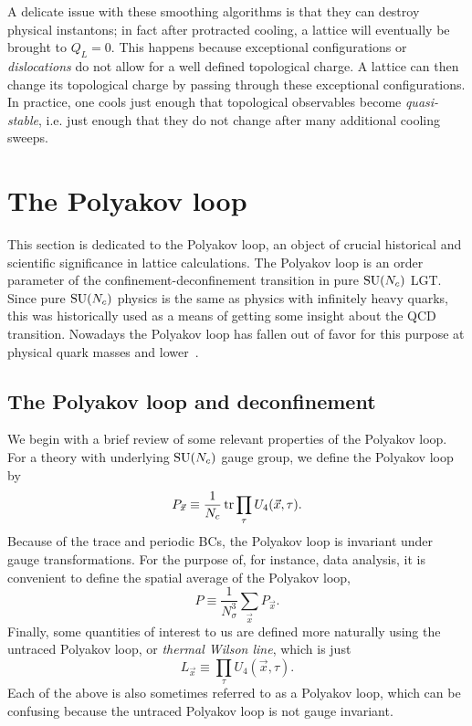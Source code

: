 A delicate issue with these smoothing algorithms is that they can destroy 
physical instantons; in fact after protracted cooling, a lattice will
eventually be brought to $Q_L=0$. This happens because
exceptional configurations or 
{\it dislocations} do not allow
for a well defined topological charge. A lattice can then change
its topological charge by passing through these exceptional configurations.
In practice, one cools just enough
that topological observables become {\it quasi-stable}, i.e. just
enough that they do not change after many additional cooling sweeps.

\section{The Polyakov loop}\label{sec:ploop}

This section is dedicated to the Polyakov loop, an object of crucial
historical and scientific significance in lattice calculations. The
Polyakov loop is an order parameter of the confinement-deconfinement
transition in pure $\operatorname{SU}(N_c)$ LGT. Since pure $\operatorname{SU}(N_c)$ physics is the 
same as physics with infinitely heavy quarks, this was historically used
as a means of getting some insight about the QCD transition. Nowadays
the Polyakov loop has fallen out of favor for this purpose at physical
quark masses and lower~\cite{clarke_polyakov_2020}.

\subsection{The Polyakov loop and deconfinement}
We begin with a brief review of some relevant properties of the
Polyakov loop. For a theory with underlying $\operatorname{SU}(N_c)$ gauge group, we define
the Polyakov loop by
\begin{equation}\label{eq:ploop}
  P_{\vec{x}}\equiv\frac{1}{N_c}\tr\prod_\tau U_4(\vec{x},\tau).
\end{equation}
Because of the trace and periodic BCs, the Polyakov loop is invariant under
gauge transformations. For the purpose of, for instance, data analysis, it
is convenient to define the spatial average of the Polyakov loop,
\begin{equation}\label{eq:ploopav}
  P\equiv\frac{1}{N_\sigma^3}\sum_{\vec{x}}P_{\vec{x}}.
\end{equation}
Finally, some quantities of interest to us are defined more
naturally using the untraced Polyakov loop, or {\it thermal Wilson line}, 
 which is just
\begin{equation}\label{eq:untracedPolyakov}
  L_{\vec{x}}\equiv\prod_\tau U_4(\vec{x},\tau).
\end{equation}
Each of the above is also sometimes referred to as a Polyakov
loop, which can be confusing because the untraced Polyakov loop is not
gauge invariant.


